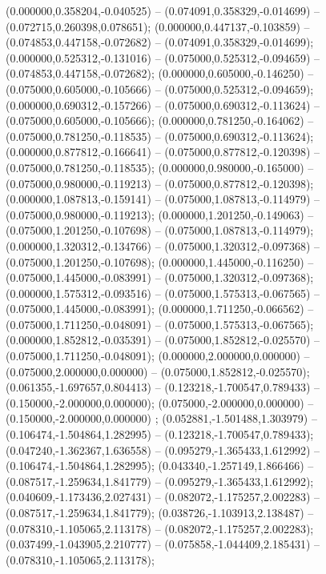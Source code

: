  (0.000000,0.358204,-0.040525) -- (0.074091,0.358329,-0.014699) -- (0.072715,0.260398,0.078651);
 (0.000000,0.447137,-0.103859) -- (0.074853,0.447158,-0.072682) -- (0.074091,0.358329,-0.014699);
 (0.000000,0.525312,-0.131016) -- (0.075000,0.525312,-0.094659) -- (0.074853,0.447158,-0.072682);
 (0.000000,0.605000,-0.146250) -- (0.075000,0.605000,-0.105666) -- (0.075000,0.525312,-0.094659);
 (0.000000,0.690312,-0.157266) -- (0.075000,0.690312,-0.113624) -- (0.075000,0.605000,-0.105666);
 (0.000000,0.781250,-0.164062) -- (0.075000,0.781250,-0.118535) -- (0.075000,0.690312,-0.113624);
 (0.000000,0.877812,-0.166641) -- (0.075000,0.877812,-0.120398) -- (0.075000,0.781250,-0.118535);
 (0.000000,0.980000,-0.165000) -- (0.075000,0.980000,-0.119213) -- (0.075000,0.877812,-0.120398);
 (0.000000,1.087813,-0.159141) -- (0.075000,1.087813,-0.114979) -- (0.075000,0.980000,-0.119213);
 (0.000000,1.201250,-0.149063) -- (0.075000,1.201250,-0.107698) -- (0.075000,1.087813,-0.114979);
 (0.000000,1.320312,-0.134766) -- (0.075000,1.320312,-0.097368) -- (0.075000,1.201250,-0.107698);
 (0.000000,1.445000,-0.116250) -- (0.075000,1.445000,-0.083991) -- (0.075000,1.320312,-0.097368);
 (0.000000,1.575312,-0.093516) -- (0.075000,1.575313,-0.067565) -- (0.075000,1.445000,-0.083991);
 (0.000000,1.711250,-0.066562) -- (0.075000,1.711250,-0.048091) -- (0.075000,1.575313,-0.067565);
 (0.000000,1.852812,-0.035391) -- (0.075000,1.852812,-0.025570) -- (0.075000,1.711250,-0.048091);
 (0.000000,2.000000,0.000000) -- (0.075000,2.000000,0.000000) -- (0.075000,1.852812,-0.025570);
 (0.061355,-1.697657,0.804413) -- (0.123218,-1.700547,0.789433) -- (0.150000,-2.000000,0.000000);
 (0.075000,-2.000000,0.000000) -- (0.150000,-2.000000,0.000000) ;
 (0.052881,-1.501488,1.303979) -- (0.106474,-1.504864,1.282995) -- (0.123218,-1.700547,0.789433);
 (0.047240,-1.362367,1.636558) -- (0.095279,-1.365433,1.612992) -- (0.106474,-1.504864,1.282995);
 (0.043340,-1.257149,1.866466) -- (0.087517,-1.259634,1.841779) -- (0.095279,-1.365433,1.612992);
 (0.040609,-1.173436,2.027431) -- (0.082072,-1.175257,2.002283) -- (0.087517,-1.259634,1.841779);
 (0.038726,-1.103913,2.138487) -- (0.078310,-1.105065,2.113178) -- (0.082072,-1.175257,2.002283);
 (0.037499,-1.043905,2.210777) -- (0.075858,-1.044409,2.185431) -- (0.078310,-1.105065,2.113178);
